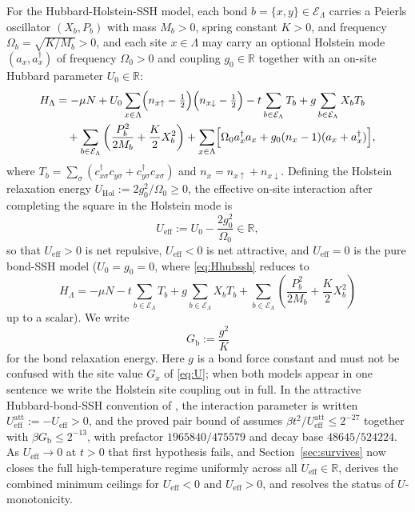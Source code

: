 \documentclass[11pt]{article}
\theoremstyle{definition}
\theoremstyle{remark}
\newcommand{\R}{\mathbb{R}}
\newcommand{\eff}{\mathrm{eff}}
\newcommand{\Gb}{G_{\mathrm{b}}}
\newcommand{\Ueff}{U_{\eff}}
\begin{document}
For the Hubbard-Holstein-SSH model, each bond $b=\{x,y\}\in\mathcal{E}_\Lambda$
carries a Peierls oscillator $(X_b,P_b)$ with mass $M_b>0$, spring constant $K>0$,
and frequency $\Omega_b=\sqrt{K/M_b}>0$, and each site $x\in\Lambda$ may carry an
optional Holstein mode $(a_x,a_x^\dagger)$ of frequency $\Omega_0>0$ and coupling
$g_0\in\R$ together with an on-site Hubbard parameter $U_0\in\R$:
\begin{equation}
\begin{aligned}
H_\Lambda
&=-\mu N+U_0\sum_{x\in\Lambda}
\Bigl(n_{x\uparrow}-\tfrac12\Bigr)\Bigl(n_{x\downarrow}-\tfrac12\Bigr)
-t\sum_{b\in\mathcal{E}_\Lambda}T_b
+g\sum_{b\in\mathcal{E}_\Lambda}X_bT_b \\
&\quad+\sum_{b\in\mathcal{E}_\Lambda}
\left(\frac{P_b^2}{2M_b}+\frac{K}{2}X_b^2\right)
+\sum_{x\in\Lambda}\Bigl[\Omega_0 a_x^\dagger a_x
+g_0(n_x-1)(a_x+a_x^\dagger)\Bigr],
\end{aligned}
\label{eq:Hhubssh}
\end{equation}
where $T_b=\sum_\sigma(c_{x\sigma}^\dagger c_{y\sigma}+c_{y\sigma}^\dagger
c_{x\sigma})$ and $n_x=n_{x\uparrow}+n_{x\downarrow}$. Defining the Holstein
relaxation energy $U_{\mathrm{Hol}}:=2g_0^2/\Omega_0\ge0$, the effective on-site
interaction after completing the square in the Holstein mode is
\begin{equation}
\Ueff:=U_0-\frac{2g_0^2}{\Omega_0}\in\R,
\label{eq:Ueff}
\end{equation}
so that $\Ueff>0$ is net repulsive, $\Ueff<0$ is net attractive, and $\Ueff=0$ is the
pure bond-SSH model ($U_0=g_0=0$, where \eqref{eq:Hhubssh} reduces to
\begin{equation}
H_\Lambda=-\mu N-t\sum_{b\in\mathcal{E}_\Lambda}T_b
+g\sum_{b\in\mathcal{E}_\Lambda}X_bT_b+\sum_{b\in\mathcal{E}_\Lambda}
\left(\frac{P_b^2}{2M_b}+\frac{K}{2}X_b^2\right)
\label{eq:Hssh}
\end{equation}
up to a scalar). We write
\begin{equation}
\Gb:=\frac{g^2}{K}
\label{eq:Gb}
\end{equation}
for the bond relaxation energy. Here $g$ is a bond force constant and must not be
confused with the site value $G_x$ of \eqref{eq:U}; when both models appear in one
sentence we write the Holstein site coupling out in full. In the attractive
Hubbard-bond-SSH convention of \cite{sshbond3}, the interaction parameter is written
$\Ueff^{\mathrm{att}}:=-\Ueff>0$, and the proved pair bound of \cite{sshbond3} assumes
$\beta t^2/\Ueff^{\mathrm{att}}\le2^{-27}$ together with $\beta\Gb\le2^{-13}$, with
prefactor $1965840/475579$ and decay base $48645/524224$. As $\Ueff\to0$ at $t>0$
that first hypothesis fails, and Section~\ref{sec:survives} now closes the full
high-temperature regime uniformly across all $\Ueff\in\R$, derives the combined
minimum ceilings for $\Ueff<0$ and $\Ueff>0$, and resolves the status of
$U$-monotonicity.
\end{document}
